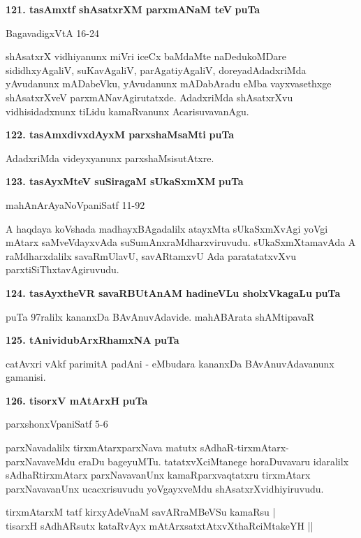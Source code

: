 \medskip
\noindent
\textbf{121. tasAmxtf shAsatxrXM parxmANaM teV} \hfill{\bf puTa }

\hfill{BagavadigxVtA 16-24}

\smallskip
shAsatxrX vidhiyanunx miVri iceCx baMdaMte naDedukoMDare sididhxyAgaliV, suKavAgaliV, parAgatiyAgaliV, doreyadAdadxriMda yAvudanunx mADabeVku, yAvudanunx mADabAradu eMba vayxvasethxge shAsatxrXveV parxmANavAgirutatxde. AdadxriMda shAsatxrXvu vidhisidadxnunx tiLidu kamaRvanunx AcarisuvavanAgu.

\medskip
\noindent
\textbf{122. tasAmxdivxdAyxM parxshaMsaMti} \hfill{\bf puTa }

\smallskip
AdadxriMda videyxyanunx parxshaMsisutAtxre.

\medskip
\noindent
\textbf{123. tasAyxMteV suSiragaM sUkaSxmXM} \hfill{\bf puTa }

\hfill{mahAnArAyaNoVpaniSatf 11-92}

\smallskip
A haqdaya koVshada madhayxBAgadalilx atayxMta sUkaSxmXvAgi yoVgi mAtarx saMveVdayxvAda suSumAnxraMdharxviruvudu. sUkaSxmXtamavAda A raMdharxdalilx savaRmUlavU, savARtamxvU Ada paratatatxvXvu parxtiSiThxtavAgiruvudu.

\eject

\noindent
\textbf{124. tasAyxtheVR savaRBUtAnAM hadineVLu sholxVkagaLu} \hfill{\bf puTa }

puTa 97ralilx kananxDa BAvAnuvAdavide. \hfill{mahABArata shAMtipavaR}

\smallskip

\noindent
\textbf{125. tAnividubArxRhamxNA} \hfill{\bf puTa }

\smallskip
catAvxri vAkf parimitA padAni - eMbudara kananxDa BAvAnuvAdavanunx gamanisi.

\medskip
\noindent
\textbf{126. tisorxV mAtArxH} \hfill{\bf puTa }

\hfill{parxshonxVpaniSatf 5-6}

\smallskip
parxNavadalilx tirxmAtarxparxNava matutx sAdhaR-tirxmAtarx-parxNavaveMdu eraDu bageyuMTu. tatatxvXciMtanege horaDuvavaru idaralilx sAdhaRtirxmAtarx parxNavavanUnx kamaRparxvaqtatxru tirxmAtarx parxNavavanUnx ucacxrisuvudu yoVgayxveMdu shAsatxrXvidhiyiruvudu.

\smallskip
\begin{shloka}
tirxmAtarxM tatf kirxyAdeVnaM savARraMBeVSu kamaRsu |\\
tisarxH sAdhARsutx kataRvAyx mAtArxsatxtAtxvXthaRciMtakeYH ||
\end{shloka}

